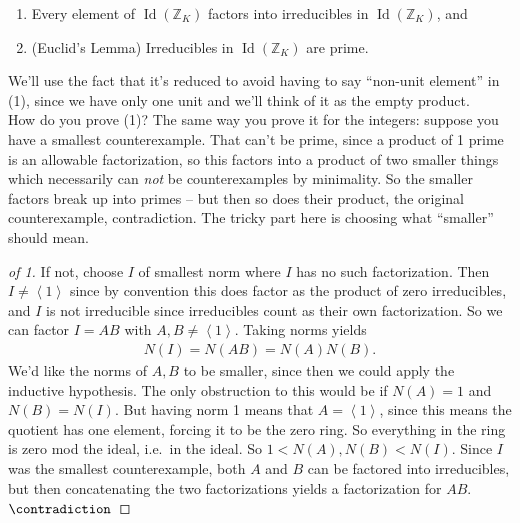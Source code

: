 \begin{proposition}

\envlist

\begin{enumerate}
\def\labelenumi{\arabic{enumi}.}
\item
  Every element of \(\operatorname{Id}({\mathbb{Z}}_K)\) factors into
  irreducibles in \(\operatorname{Id}({\mathbb{Z}}_K)\), and
\item
  (Euclid's Lemma) Irreducibles in \(\operatorname{Id}({\mathbb{Z}}_K)\)
  are prime.
\end{enumerate}

\end{proposition}

\begin{remark}

We'll use the fact that it's reduced to avoid having to say ``non-unit
element'' in (1), since we have only one unit and we'll think of it as
the empty product.\\

How do you prove (1)? The same way you prove it for the integers:
suppose you have a smallest counterexample. That can't be prime, since a
product of 1 prime is an allowable factorization, so this factors into a
product of two smaller things which necessarily can \emph{not} be
counterexamples by minimality. So the smaller factors break up into
primes -- but then so does their product, the original counterexample,
contradiction. The tricky part here is choosing what ``smaller'' should
mean.

\end{remark}

\begin{proof}[of 1]

If not, choose \(I\) of smallest norm where \(I\) has no such
factorization. Then \(I \neq \left\langle{ 1 }\right\rangle\) since by
convention this does factor as the product of zero irreducibles, and
\(I\) is not irreducible since irreducibles count as their own
factorization. So we can factor \(I = AB\) with
\(A, B \neq \left\langle{ 1 }\right\rangle\). Taking norms yields
\begin{align*}
N(I) = N(AB) = N(A) N(B)
.\end{align*}
We'd like the norms of \(A, B\) to be smaller, since then we could apply
the inductive hypothesis. The only obstruction to this would be if
\(N(A) = 1\) and \(N(B) = N(I)\). But having norm 1 means that
\(A = \left\langle{ 1 }\right\rangle\), since this means the quotient
has one element, forcing it to be the zero ring. So everything in the
ring is zero mod the ideal, i.e.~in the ideal. So
\(1 < N(A), N(B) < N(I)\). Since \(I\) was the smallest counterexample,
both \(A\) and \(B\) can be factored into irreducibles, but then
concatenating the two factorizations yields a factorization for \(AB\).
\(\contradiction\)

\end{proof}

